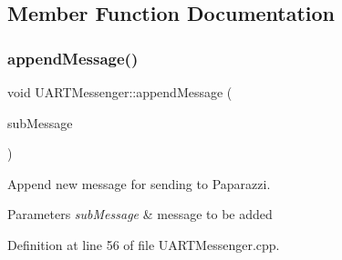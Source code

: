 \subsection{Member Function Documentation}
\mbox{\label{class_u_a_r_t_messenger_ada0967869e320c236a211b405abf128a}} 
\subsubsection{\texorpdfstring{append\+Message()}{appendMessage()}}
{\footnotesize\ttfamily void U\+A\+R\+T\+Messenger\+::append\+Message (\begin{DoxyParamCaption}\item[{const \hyperlink{struct_sub_message}{Sub\+Message} \&}]{sub\+Message }\end{DoxyParamCaption})}



Append new message for sending to Paparazzi. 


\begin{DoxyParams}{Parameters}
{\em sub\+Message} & message to be added \\
\hline
\end{DoxyParams}


Definition at line 56 of file U\+A\+R\+T\+Messenger.\+cpp.



